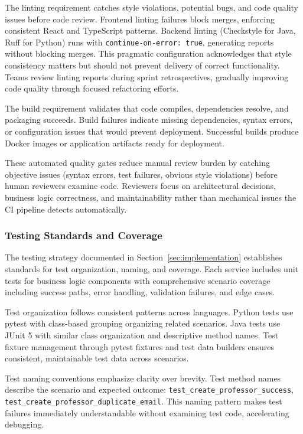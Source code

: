 \documentclass[12pt,a4paper]{article}
\begin{document}
The linting requirement catches style violations, potential bugs, and code quality issues before code review. Frontend linting failures block merges, enforcing consistent React and TypeScript patterns. Backend linting (Checkstyle for Java, Ruff for Python) runs with \texttt{continue-on-error: true}, generating reports without blocking merges. This pragmatic configuration acknowledges that style consistency matters but should not prevent delivery of correct functionality. Teams review linting reports during sprint retrospectives, gradually improving code quality through focused refactoring efforts.\newline

The build requirement validates that code compiles, dependencies resolve, and packaging succeeds. Build failures indicate missing dependencies, syntax errors, or configuration issues that would prevent deployment. Successful builds produce Docker images or application artifacts ready for deployment.\newline

These automated quality gates reduce manual review burden by catching objective issues (syntax errors, test failures, obvious style violations) before human reviewers examine code. Reviewers focus on architectural decisions, business logic correctness, and maintainability rather than mechanical issues the CI pipeline detects automatically.

\subsubsection{Testing Standards and Coverage}

The testing strategy documented in Section~\ref{sec:implementation} establishes standards for test organization, naming, and coverage. Each service includes unit tests for business logic components with comprehensive scenario coverage including success paths, error handling, validation failures, and edge cases.\newline

Test organization follows consistent patterns across languages. Python tests use pytest with class-based grouping organizing related scenarios. Java tests use JUnit 5 with similar class organization and descriptive method names. Test fixture management through pytest fixtures and test data builders ensures consistent, maintainable test data across scenarios.\newline

Test naming conventions emphasize clarity over brevity. Test method names describe the scenario and expected outcome: \texttt{test\_create\_professor\_success}, \nolinkurl{test\_create\_professor\_duplicate\_email}. This naming pattern makes test failures immediately understandable without examining test code, accelerating debugging.\newline
\end{document}
